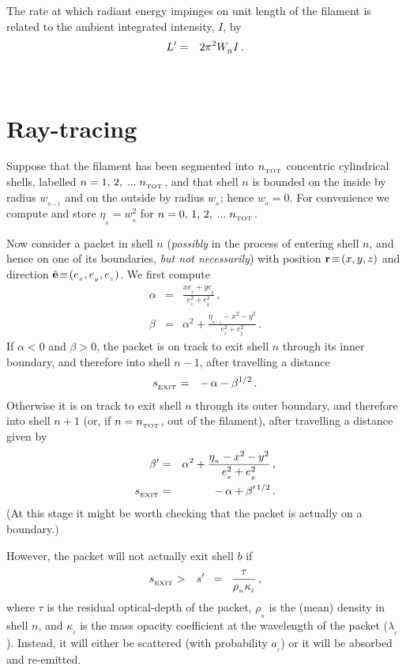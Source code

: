 \documentclass[usenatbib]{mn2e}
\newcommand{\subB}{_{_{\rm B}}}
\numberwithin{equation}{section}
\begin{document}
The rate at which radiant energy impinges on unit length of the filament is related to the ambient integrated intensity, $I$, by
\begin{eqnarray}
L'&=&2\pi^2W\subB I\,.
\end{eqnarray}





\section{Ray-tracing}\label{APP:RayTracing}

Suppose that the filament has been segmented into $n_{_{\rm TOT}}$ concentric cylindrical shells, labelled $n=1,\,2,\;...\;n_{_{\rm TOT}}$, and that shell $n$ is bounded on the inside by radius $w_{_{n-1}}$ and on the outside by radius $w_{_n}$; hence $w_{_0}\!=\!0$. For convenience we compute and store $\eta_{_n}\!=\!w_{_n}^2$ for $n=0,\,1,\,2,\;...\;n_{_{\rm TOT}}$.

Now consider a packet in shell $n$ ({\it possibly} in the process of entering shell $n$, and hence on one of its boundaries, {\it but not necessarily}) with position ${\bf r}\!\equiv\!(x,y,z)$ and direction $\hat{\bf e}\!\equiv\!(e_{_x},e_{_y},e_{_z})$. We first compute 
\begin{eqnarray}
\alpha&=&\frac{xe_{_x}+ye_{_y}}{e_{_x}^2+e_{_y}^2}\,,\\
\beta&=&\alpha^2+\frac{\eta_{_{n-1}}-x^2-y^2}{e_{_x}^2+e_{_y}^2}\,.
\end{eqnarray}
If $\alpha<0$ and $\beta>0$, the packet is on track to exit shell $n$ through its inner boundary, and therefore into shell $n-1$, after travelling a distance 
\begin{eqnarray}
s_{_{\rm EXIT}}&=&-\,\alpha-\beta^{1/2}\,.
\end{eqnarray}
Otherwise it is on track to exit shell $n$ through its outer boundary, and therefore into shell $n+1$ (or, if $n=n_{_{\rm TOT}}$, out of the filament), after travelling a distance given by
\begin{eqnarray}
\beta'&=&\alpha^2+\frac{\eta_{_n}-x^2-y^2}{e_{_x}^2+e_{_y}^2}\,,\\
s_{_{\rm EXIT}}&=&-\,\alpha+\beta'^{\,1/2}\,.
\end{eqnarray}
(At this stage it might be worth checking that the packet is actually on a boundary.)

However, the packet will not actually exit shell $b$ if 
\begin{eqnarray}
s_{_{\rm EXIT}}&>&s'\;\;=\;\;\frac{\tau}{\rho_{_n}\kappa_{_\ell}}\,,
\end{eqnarray}
where $\tau$ is the residual optical-depth of the packet, $\rho_{_n}$ is the (mean) density in shell $n$, and $\kappa_{_\ell}$ is the mass opacity coefficient at the wavelength of the packet ($\lambda_{_\ell}$). Instead, it will either be scattered (with probability $a_{_\ell}$) or it will be absorbed and re-emitted. 
\end{document}
